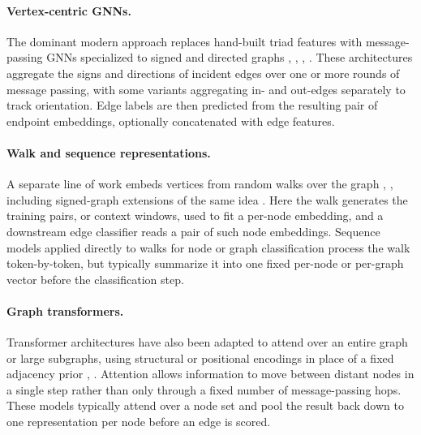 \documentclass[letterpaper]{article} %
\theoremstyle{plain}
\theoremstyle{definition}
\begin{document}
\paragraph{Vertex-centric GNNs.} The dominant modern approach replaces hand-built triad features with message-passing GNNs specialized to signed and directed graphs \citep{PLACEHOLDER: SGCN}, \citep{PLACEHOLDER: SiGAT}, \citep{PLACEHOLDER: SNEA}, \citep{PLACEHOLDER: SDGNN / SGA-GSGNN or other directed signed GNN}. These architectures aggregate the signs and directions of incident edges over one or more rounds of message passing, with some variants aggregating in- and out-edges separately to track orientation. Edge labels are then predicted from the resulting pair of endpoint embeddings, optionally concatenated with edge features.
\paragraph{Walk and sequence representations.} A separate line of work embeds vertices from random walks over the graph \citep{PLACEHOLDER: DeepWalk}, \citep{PLACEHOLDER: node2vec}, including signed-graph extensions of the same idea \citep{PLACEHOLDER: signed/directed walk-based embedding method}. Here the walk generates the training pairs, or context windows, used to fit a per-node embedding, and a downstream edge classifier reads a pair of such node embeddings. Sequence models applied directly to walks for node or graph classification \citep{PLACEHOLDER: walk-based sequence/RNN or transformer node classifier} process the walk token-by-token, but typically summarize it into one fixed per-node or per-graph vector before the classification step.
\paragraph{Graph transformers.} Transformer architectures have also been adapted to attend over an entire graph or large subgraphs, using structural or positional encodings in place of a fixed adjacency prior \citep{PLACEHOLDER: Graphormer}, \citep{PLACEHOLDER: GPS / SAT or other graph transformer}. Attention allows information to move between distant nodes in a single step rather than only through a fixed number of message-passing hops. These models typically attend over a node set and pool the result back down to one representation per node before an edge is scored.
\end{document}
